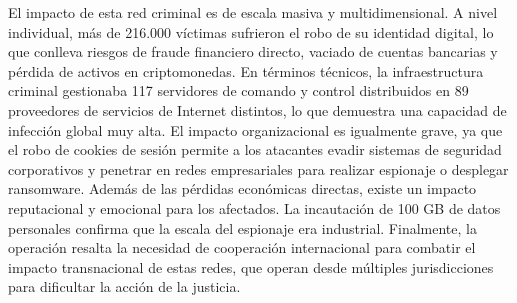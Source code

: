     El impacto de esta red criminal es de escala masiva y multidimensional. A nivel individual, más de 216.000 víctimas 
    sufrieron el robo de su identidad digital, lo que conlleva riesgos de fraude financiero directo, vaciado de cuentas 
    bancarias y pérdida de activos en criptomonedas. En términos técnicos, la infraestructura criminal gestionaba 117 servidores de 
    comando y control distribuidos en 89 proveedores de servicios de Internet distintos, lo que demuestra una capacidad de 
    infección global muy alta. El impacto organizacional es igualmente grave, ya que el robo de cookies de sesión permite a los 
    atacantes evadir sistemas de seguridad corporativos y penetrar en redes empresariales para realizar espionaje o desplegar 
    ransomware. Además de las pérdidas económicas directas, existe un impacto reputacional y emocional para los afectados. 
    La incautación de 100 GB de datos personales confirma que la escala del espionaje era industrial. Finalmente, la operación resalta 
    la necesidad de cooperación internacional para combatir el impacto transnacional de estas redes, que operan desde múltiples
     jurisdicciones para dificultar la acción de la justicia.
